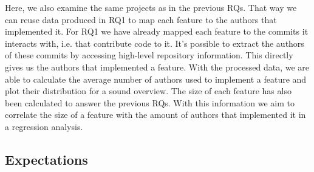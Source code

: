 Here, we also examine the same projects as in the previous RQs.
That way we can reuse data produced in RQ1 to map each feature to the authors that implemented it.
For RQ1 we have already mapped each feature to the commits it interacts with, i.e. that contribute code to it.
It's possible to extract the authors of these commits by accessing high-level repository information.
This directly gives us the authors that implemented a feature.
With the processed data, we are able to calculate the average number of authors used to implement a feature and plot their distribution for a sound overview.
The size of each feature has also been calculated to answer the previous RQs.
With this information we aim to correlate the size of a feature with the amount of authors that implemented it in a regression analysis.

\subsection{Expectations}\label{sec:expectations}

